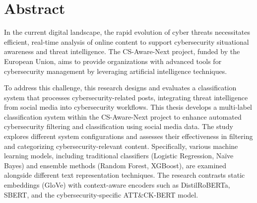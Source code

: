 \documentclass{Configuration_Files/PoliMi3i_thesis}
\begin{document}

\pagestyle{empty} %
\frontmatter %


\startpreamble
\setcounter{page}{1} %

\chapter*{Abstract}
In the current digital landscape, the rapid evolution of cyber threats necessitates efficient, real-time analysis of online content to support cybersecurity situational awareness and threat intelligence. The CS-Aware-Next project, funded by the European Union, aims to provide organizations with advanced tools for cybersecurity management by leveraging artificial intelligence techniques.

To address this challenge, this research designs and evaluates a classification system that processes cybersecurity-related posts, integrating threat intelligence from social media into cybersecurity workflows. This thesis develops a multi-label classification system within the CS-Aware-Next project to enhance automated cybersecurity filtering and classification using social media data. The study explores different system configurations and assesses their effectiveness in filtering and categorizing cybersecurity-relevant content. Specifically, various machine learning models, including traditional classifiers (Logistic Regression, Naïve Bayes) and ensemble methods (Random Forest, XGBoost), are examined alongside different text representation techniques. The research contrasts static embeddings (GloVe) with context-aware encoders such as DistilRoBERTa, SBERT, and the cybersecurity-specific ATT{\&}CK-BERT model.
\end{document}
